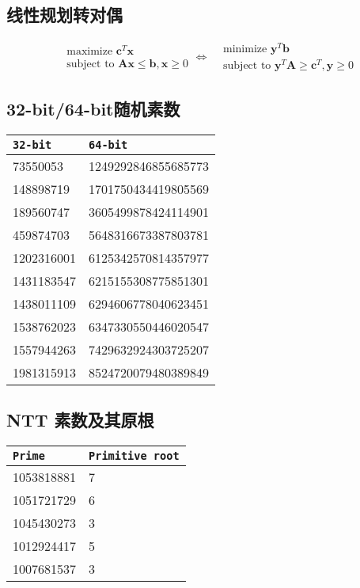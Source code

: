 \documentclass[landscape,a4paper]{article}
\begin{document}
\begin{spacing}{0.3}
\begin{multicols}{2}
\subsection{线性规划转对偶}

\begin{equation*}
\begin{aligned}
&\text{maximize }\mathbf{c}^{T}\mathbf{x}\\
&\text{subject to }\mathbf{A}\mathbf{x} \leq \mathbf{b}, \mathbf{x} \geq 0
\end{aligned}
\Longleftrightarrow
\begin{aligned}
&\text{minimize }\mathbf{y}^{T}\mathbf{b}\\
&\text{subject to }\mathbf{y}^{T}\mathbf{A} \geq \mathbf{c}^{T}, \mathbf{y} \geq 0
\end{aligned}
\end{equation*}

\subsection{32-bit/64-bit随机素数}
\begin{tabular}{|l|l|}
\hline
\texttt{32-bit} & \texttt{64-bit} \\
\hline
73550053 & 1249292846855685773 \\
\hline
148898719 & 1701750434419805569 \\
\hline
189560747 & 3605499878424114901 \\
\hline
459874703 & 5648316673387803781 \\
\hline
1202316001 & 6125342570814357977 \\
\hline
1431183547 & 6215155308775851301 \\
\hline
1438011109 & 6294606778040623451 \\
\hline
1538762023 & 6347330550446020547 \\
\hline
1557944263 & 7429632924303725207 \\
\hline
1981315913 & 8524720079480389849 \\
\hline
\end{tabular}

\subsection{NTT 素数及其原根}
\begin{tabular}{|l|l|}
\hline
\texttt{Prime} & \texttt{Primitive root} \\
\hline
1053818881 & 7 \\
\hline
1051721729 & 6 \\
\hline
1045430273 & 3 \\
\hline
1012924417 & 5 \\
\hline
1007681537 & 3 \\
\hline
\end{tabular}



\end{multicols}
\end{spacing}
\end{document}
